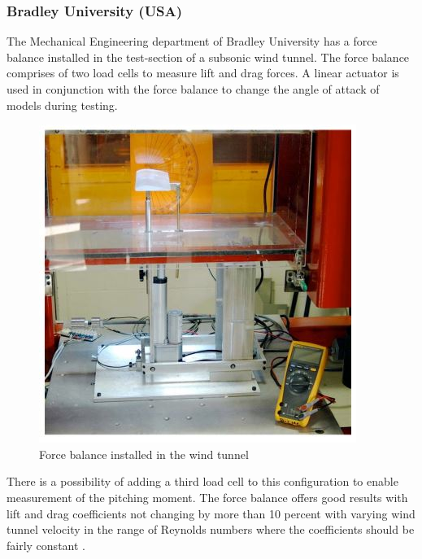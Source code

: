 \subsubsection{Bradley University (USA)}
The Mechanical Engineering department of Bradley University has a force balance installed in the test-section of a subsonic wind tunnel. The force balance comprises of two load cells to measure lift and drag forces. A linear actuator is used in conjunction with the force balance to change the angle of attack of models during testing.
\begin{center}
	\begin{figure}[H]
		\centering
		\includegraphics[width=0.6\linewidth]{Figures/force}
		\caption[Force balance installed]{Force balance installed in the wind tunnel \cite{morris_force_2010}}
	\end{figure}
\end{center}
There is a possibility of adding a third load cell to this configuration to enable measurement of the pitching moment. The force balance offers good results with lift and drag coefficients not changing by more than 10 percent with varying wind tunnel velocity in the range of Reynolds
numbers where the coefficients should be fairly constant \cite{morris_force_2010}.

